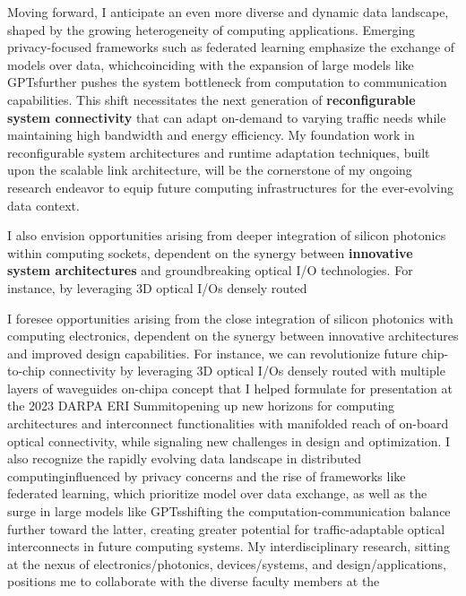 Moving forward, I anticipate an even more diverse and dynamic data landscape, shaped by the growing heterogeneity of computing applications. Emerging privacy-focused frameworks such as federated learning emphasize the exchange of models over data, which\textemdash coinciding with the expansion of large models like GPTs\textemdash further pushes the system bottleneck from computation to communication capabilities. This shift necessitates the next generation of \textbf{reconfigurable system connectivity} that can adapt on-demand to varying traffic needs while maintaining high bandwidth and energy efficiency. My foundation work in reconfigurable system architectures and runtime adaptation techniques, built upon the scalable link architecture, will be the cornerstone of my ongoing research endeavor to equip future computing infrastructures for the ever-evolving data context.

I also envision opportunities arising from deeper integration of silicon photonics within computing sockets, dependent on the synergy between \textbf{innovative system architectures} and groundbreaking optical I/O technologies. For instance, by leveraging 3D optical I/Os densely routed



I foresee opportunities arising from the close integration of silicon photonics with computing electronics, dependent on the synergy between innovative architectures and improved design capabilities. For instance, we can revolutionize future chip-to-chip connectivity by leveraging 3D optical I/Os densely routed with multiple layers of waveguides on-chip\textemdash a concept that I helped formulate for presentation at the 2023 DARPA ERI Summit\textemdash opening up new horizons for
computing architectures and interconnect functionalities with manifolded reach of on-board optical connectivity, while signaling new challenges in design and optimization. I also recognize the rapidly evolving data landscape in distributed computing\textemdash influenced by privacy concerns and the rise of frameworks like federated learning, which prioritize model over data exchange, as well as the surge in large models like GPTs\textemdash shifting the computation-communication balance further toward the latter, creating greater potential for traffic-adaptable optical interconnects in future computing systems. My interdisciplinary research, sitting at the nexus of electronics/photonics, devices/systems, and design/applications, positions me to collaborate with the diverse faculty members at the \appSchool{}%
